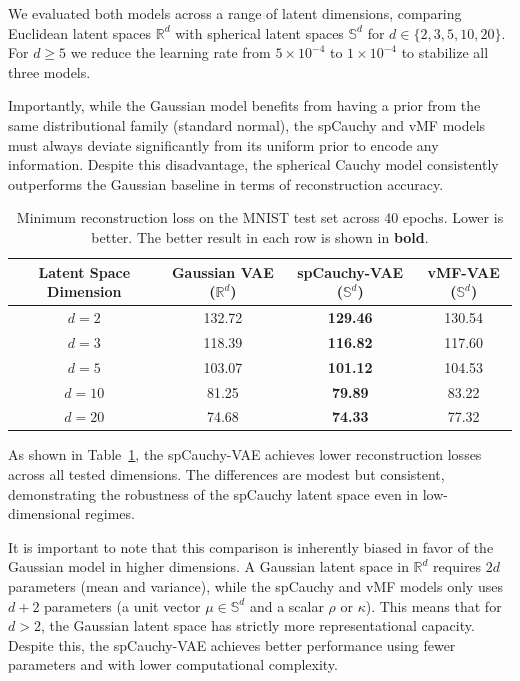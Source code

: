 \documentclass{article}
\begin{document}
We evaluated both models across a range of latent dimensions, comparing Euclidean latent spaces \(\mathbb{R}^d\) with spherical latent spaces \(\mathbb{S}^d\) for \(d \in \{2, 3, 5, 10, 20\}\).  For $d \ge 5$ we reduce the learning rate from $5\times10^{-4}$ to $1\times10^{-4}$ to stabilize all three models.

Importantly, while the Gaussian model benefits from having a prior from the same distributional family (standard normal), the spCauchy and vMF models must always deviate significantly from its uniform prior to encode any information. Despite this disadvantage, the spherical Cauchy model consistently outperforms the Gaussian baseline in terms of reconstruction accuracy.

\begin{table}[ht]
\centering
\caption{Minimum reconstruction loss on the MNIST test set across 40 epochs. Lower is better. The better result in each row is shown in \textbf{bold}.}
\vspace{0.3em}
\begin{tabular}{c|ccc}
\toprule
Latent Space Dimension & Gaussian VAE (\(\mathbb{R}^d\)) & spCauchy-VAE (\(\mathbb{S}^d\)) & vMF-VAE (\(\mathbb{S}^d\)) \\
\midrule
\(d = 2\)  & 132.72 & \textbf{129.46} & 130.54 \\
\(d = 3\)  & 118.39 & \textbf{116.82} & 117.60 \\
\(d = 5\)  & 103.07 & \textbf{101.12} & 104.53\\
\(d = 10\) & 81.25  & \textbf{79.89}  & 83.22 \\
\(d = 20\) & 74.68  & \textbf{74.33}  & 77.32 \\
\bottomrule
\end{tabular}
\label{tab:mnist-comparison}
\end{table}

\vspace{1em}

As shown in Table~\ref{tab:mnist-comparison}, the spCauchy-VAE achieves lower reconstruction losses across all tested dimensions. The differences are modest but consistent, demonstrating the robustness of the spCauchy latent space even in low-dimensional regimes.

It is important to note that this comparison is inherently biased in favor of the Gaussian model in higher dimensions. A Gaussian latent space in \(\mathbb{R}^d\) requires \(2d\) parameters (mean and variance), while the spCauchy and vMF models only uses \(d + 2\) parameters (a unit vector \(\mu \in \mathbb{S}^d\) and a scalar \(\rho\) or \(\kappa\)). This means that for \(d > 2\), the Gaussian latent space has strictly more representational capacity. Despite this, the spCauchy-VAE achieves better performance using fewer parameters and with lower computational complexity.
\end{document}
